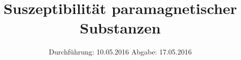 
\subject{606}
\title{Suszeptibilität paramagnetischer Substanzen}
\date{
  Durchführung: 10.05.2016
  \hspace{3em}
  Abgabe: 17.05.2016
}



\maketitle
\newpage
\mbox{}
\newpage
\thispagestyle{empty}
\tableofcontents
\newpage






\nocite{numpy}
\nocite{matplotlib}
\nocite{uncertainties}
\printbibliography


